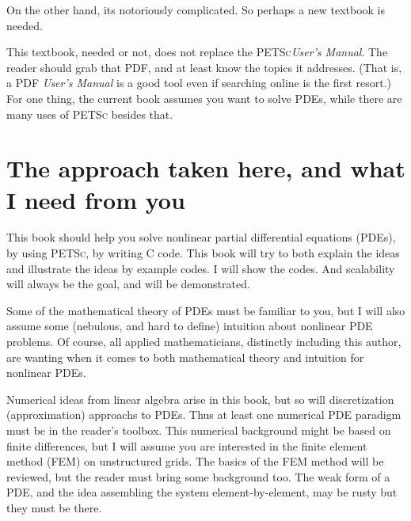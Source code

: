 \documentclass{tufte-book}
\newcommand{\PETSc}{\textsc{PETSc}\xspace}
\begin{document}
On the other hand, its notoriously complicated.  So perhaps a new textbook is needed.

This textbook, needed or not, does not replace the \PETSc \emph{User's Manual}.  The reader should grab that PDF, and at least know the topics it addresses.  (That is, a PDF \emph{User's Manual} is a good tool even if searching online is the first resort.)  For one thing, the current book assumes you want to solve PDEs, while there are many uses of \PETSc besides that.

\section{The approach taken here, and what I need from you}  This book should help you solve nonlinear partial differential equations (PDEs), by using \PETSc, by writing C code.  This book will try to both explain the ideas and illustrate the ideas by example codes.  I will show the codes.  And scalability will always be the goal, and will be demonstrated.

Some of the mathematical theory of PDEs must be familiar to you, but I will also assume some (nebulous, and hard to define) intuition about nonlinear PDE problems.  Of course, all applied mathematicians, distinctly including this author, are wanting  when it comes to both mathematical theory and intuition for nonlinear PDEs.

Numerical ideas from linear algebra \citep{TrefethenBau} arise in this book, but so will discretization (approximation) approachs to PDEs.  Thus at least one numerical PDE paradigm must be in the reader's toolbox.  This numerical background might be based on finite differences, but I will assume you are interested in the finite element method (FEM) on unstructured grids.  The basics of the FEM method will be reviewed, but the reader must bring some background too.  The weak form of a PDE, and the idea assembling the system element-by-element, may be rusty but they must be there.
\end{document}
